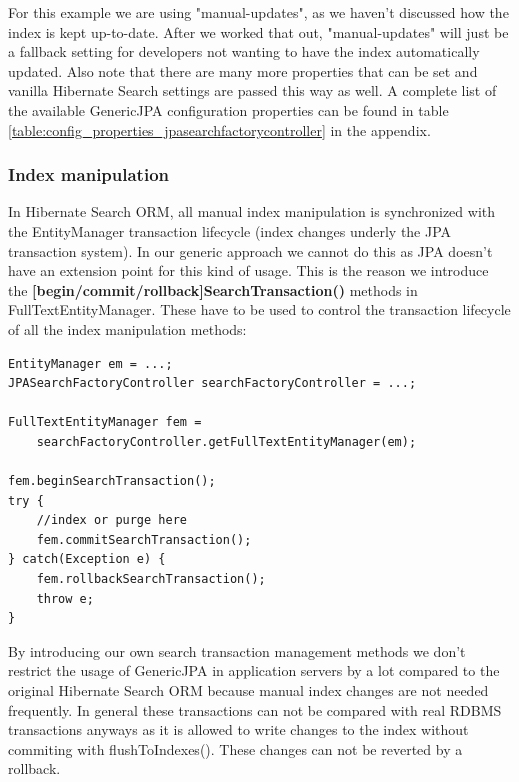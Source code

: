 \noindent
For this example we are using "manual-updates", as we haven't discussed how the index is kept up-to-date. After we worked that out, "manual-updates" will just be a fallback setting for developers not wanting to have the index automatically updated.  Also note that there are many more properties that can be set and vanilla Hibernate Search settings are passed this way as well. A complete list of the available GenericJPA configuration properties can be found in table \ref{table:config_properties_jpasearchfactorycontroller} in the appendix.

\pagebreak

\subsubsection{Index manipulation} \label{using_hsearch_genericjpa_index}

In Hibernate Search ORM, all manual index manipulation is synchronized with the EntityManager transaction lifecycle (index changes underly the JPA transaction system). In our generic approach we cannot do this as JPA doesn't have an extension point for this kind of usage. This is the reason we introduce the \textbf{[begin/commit/rollback]SearchTransaction()} methods in FullTextEntityManager. These have to be used to control the transaction lifecycle of all the index manipulation methods:
\\
\lstset{language=java}
\begin{lstlisting}[frame=htrbl, caption={Index control with Hibernate Search GenericJPA}, label={lst:index_control_hibernatesearchgenericjpa}]
EntityManager em = ...;
JPASearchFactoryController searchFactoryController = ...;

FullTextEntityManager fem = 
	searchFactoryController.getFullTextEntityManager(em);

fem.beginSearchTransaction();
try {
	//index or purge here
	fem.commitSearchTransaction();
} catch(Exception e) {
	fem.rollbackSearchTransaction();
	throw e;
}
\end{lstlisting}
\noindent
By introducing our own search transaction management methods we don't restrict the usage of GenericJPA in application servers by a lot compared to the original Hibernate Search ORM because manual index changes are not needed frequently. In general these transactions can not be compared with real RDBMS transactions anyways as it is allowed to write changes to the index without commiting with flushToIndexes(). These changes can not be reverted by a rollback.

